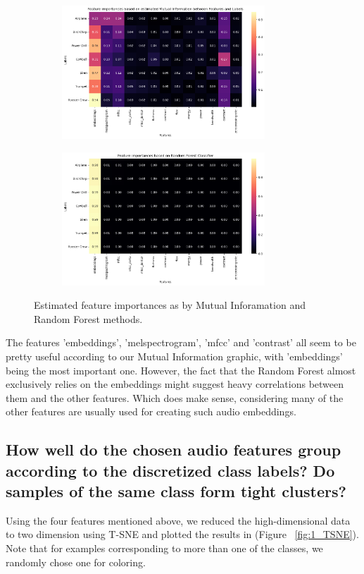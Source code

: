\begin{figure}[htbp]
  \centering
  \begin{subfigure}[b]{0.49\textwidth}
    \includegraphics[width=\textwidth, height=5cm]{figs/1_MI.png}
  \end{subfigure}
  \hfill
  \begin{subfigure}[b]{0.49\textwidth}
    \includegraphics[width=\textwidth, height=5cm]{figs/1_RF.png}
  \end{subfigure}
  \caption{Estimated feature importances as by Mutual Inforamation and Random Forest methods.}
  \label{fig:1_FI}
\end{figure}

The features 'embeddings', 'melspectrogram', 'mfcc' and 'contrast' all seem to be pretty useful according to our Mutual Information graphic, with 'embeddings' being the most important one. However, the fact that the Random Forest almost exclusively relies on the embeddings might suggest heavy correlations between them and the other features. Which does make sense, considering many of the other features are usually used for creating such audio embeddings.


\subsection{How well do the chosen audio features group according to the discretized class labels? Do samples of the same class form tight clusters?}
\label{sec:Labeling Function:c}
Using the four features mentioned above, we reduced the high-dimensional data to two dimension using T-SNE and plotted the results in (Figure ~\ref{fig:1_TSNE}). Note that for examples corresponding to more than one of the classes, we randomly chose one for coloring.

